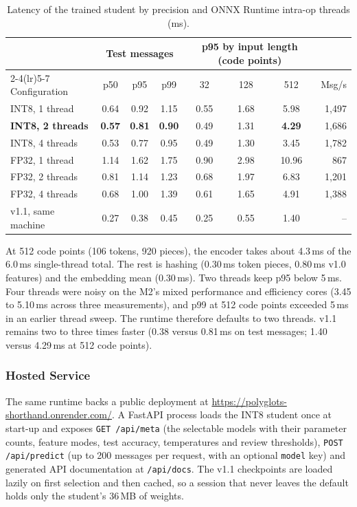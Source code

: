 \documentclass[11pt,a4paper]{article}
\theoremstyle{remark}
\begin{document}
\begin{table}[h]
\centering\small
\caption{Latency of the trained student by precision and ONNX Runtime intra-op threads (ms).}
\label{tab:v12latency}
\begin{tabular}{@{}l ccc ccc r@{}}
\toprule
& \multicolumn{3}{c}{Test messages} & \multicolumn{3}{c}{p95 by input length (code points)} & \\
\cmidrule(lr){2-4}\cmidrule(lr){5-7}
Configuration & p50 & p95 & p99 & 32 & 128 & 512 & Msg/s \\
\midrule
INT8, 1 thread  & 0.64 & 0.92 & 1.15 & 0.55 & 1.68 & 5.98 & 1{,}497 \\
\textbf{INT8, 2 threads} & \textbf{0.57} & \textbf{0.81} & \textbf{0.90} & 0.49 & 1.31 & \textbf{4.29} & 1{,}686 \\
INT8, 4 threads & 0.53 & 0.77 & 0.95 & 0.49 & 1.30 & 3.45 & 1{,}782 \\
FP32, 1 thread  & 1.14 & 1.62 & 1.75 & 0.90 & 2.98 & 10.96 & 867 \\
FP32, 2 threads & 0.81 & 1.14 & 1.23 & 0.68 & 1.97 & 6.83 & 1{,}201 \\
FP32, 4 threads & 0.68 & 1.00 & 1.39 & 0.61 & 1.65 & 4.91 & 1{,}388 \\
\midrule
v1.1, same machine & 0.27 & 0.38 & 0.45 & 0.25 & 0.55 & 1.40 & -- \\
\bottomrule
\end{tabular}
\end{table}

At 512 code points (106 tokens, 920 pieces), the encoder takes about 4.3\,ms of the 6.0\,ms single-thread total. The rest is hashing (0.30\,ms token pieces, 0.80\,ms v1.0 features) and the embedding mean (0.30\,ms). Two threads keep p95 below 5\,ms. Four threads were noisy on the M2's mixed performance and efficiency cores (3.45 to 5.10\,ms across three measurements), and p99 at 512 code points exceeded 5\,ms in an earlier thread sweep. The runtime therefore defaults to two threads. v1.1 remains two to three times faster (0.38 versus 0.81\,ms on test messages; 1.40 versus 4.29\,ms at 512 code points).

\subsubsection{Hosted Service}
\label{sec:v12hosted}

The same runtime backs a public deployment at
\url{https://polyglots-shorthand.onrender.com/}. A FastAPI process loads the
INT8 student once at start-up and exposes \texttt{GET /api/meta} (the
selectable models with their parameter counts, feature modes, test accuracy,
temperatures and review thresholds), \texttt{POST /api/predict} (up to 200
messages per request, with an optional \texttt{model} key) and generated API
documentation at \texttt{/api/docs}. The v1.1 checkpoints are loaded lazily on
first selection and then cached, so a session that never leaves the default
holds only the student's 36\,MB of weights.
\end{document}
